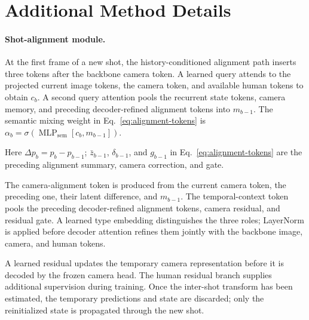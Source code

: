 \section{Additional Method Details}
\label{app:method-details}

\paragraph{Shot-alignment module.}
At the first frame of a new shot, the history-conditioned alignment path
inserts three tokens after the backbone camera token. A learned query attends to
the projected current image tokens, the camera token, and available human
tokens to obtain $c_b$. A second query attention pools the recurrent state
tokens, camera memory, and preceding decoder-refined alignment tokens into
$m_{b-1}$. The semantic mixing weight in Eq.~\ref{eq:alignment-tokens} is
$\alpha_b=\sigma(\operatorname{MLP}_{\mathrm{sem}}[c_b,m_{b-1}])$.

Here $\Delta p_b=p_b-p_{b-1}$; $\bar z_{b-1}$, $\delta_{b-1}$, and
$g_{b-1}$ in Eq.~\ref{eq:alignment-tokens} are the preceding alignment summary,
camera correction, and gate.

The camera-alignment token is produced from the current camera token, the
preceding one, their latent difference, and $m_{b-1}$. The
temporal-context token pools the preceding decoder-refined alignment tokens,
camera residual, and residual gate. A learned type embedding distinguishes the
three roles; LayerNorm is applied before decoder attention refines them jointly
with the backbone image, camera, and human tokens.

A learned residual updates the temporary camera representation before it is
decoded by the frozen camera head. The human residual branch supplies
additional supervision during training. Once the inter-shot transform has
been estimated, the temporary predictions and state are discarded; only the
reinitialized state is propagated through the new shot.

